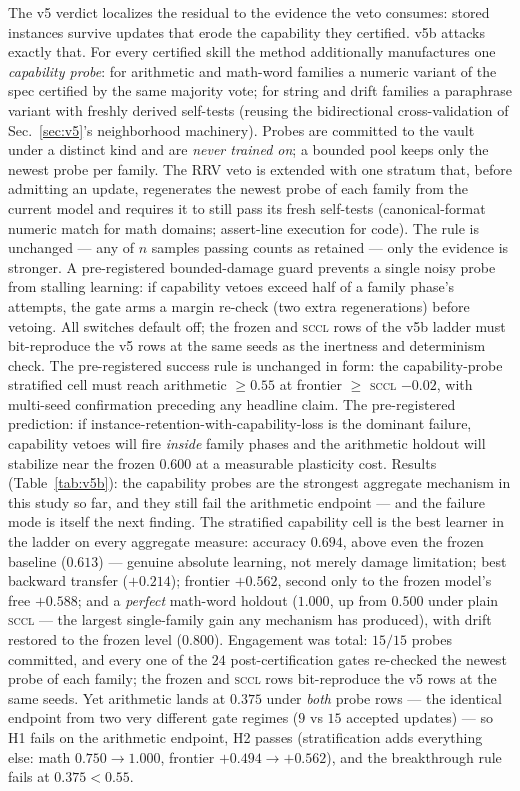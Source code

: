 \documentclass[10pt,conference]{IEEEtran}
\begin{document}
The v5 verdict localizes the residual to the evidence the veto consumes: stored instances survive updates that erode the capability they certified. v5b attacks exactly that. For every certified skill the method additionally manufactures one \emph{capability probe}: for arithmetic and math-word families a numeric variant of the spec certified by the same majority vote; for string and drift families a paraphrase variant with freshly derived self-tests (reusing the bidirectional cross-validation of Sec.~\ref{sec:v5}'s neighborhood machinery). Probes are committed to the vault under a distinct kind and are \emph{never trained on}; a bounded pool keeps only the newest probe per family. The RRV veto is extended with one stratum that, before admitting an update, regenerates the newest probe of each family from the current model and requires it to still pass its fresh self-tests (canonical-format numeric match for math domains; assert-line execution for code). The rule is unchanged --- any of $n$ samples passing counts as retained --- only the evidence is stronger. A pre-registered bounded-damage guard prevents a single noisy probe from stalling learning: if capability vetoes exceed half of a family phase's attempts, the gate arms a margin re-check (two extra regenerations) before vetoing. All switches default off; the frozen and \textsc{sccl} rows of the v5b ladder must bit-reproduce the v5 rows at the same seeds as the inertness and determinism check. The pre-registered success rule is unchanged in form: the capability-probe stratified cell must reach arithmetic $\geq 0.55$ at frontier $\geq$ \textsc{sccl} $-0.02$, with multi-seed confirmation preceding any headline claim. The pre-registered prediction: if instance-retention-with-capability-loss is the dominant failure, capability vetoes will fire \emph{inside} family phases and the arithmetic holdout will stabilize near the frozen $0.600$ at a measurable plasticity cost. Results (Table~\ref{tab:v5b}): the capability probes are the strongest aggregate mechanism in this study so far, and they still fail the arithmetic endpoint --- and the failure mode is itself the next finding. The stratified capability cell is the best learner in the ladder on every aggregate measure: accuracy $0.694$, above even the frozen baseline ($0.613$) --- genuine absolute learning, not merely damage limitation; best backward transfer ($+0.214$); frontier $+0.562$, second only to the frozen model's free $+0.588$; and a \emph{perfect} math-word holdout ($1.000$, up from $0.500$ under plain \textsc{sccl} --- the largest single-family gain any mechanism has produced), with drift restored to the frozen level ($0.800$). Engagement was total: $15/15$ probes committed, and every one of the $24$ post-certification gates re-checked the newest probe of each family; the frozen and \textsc{sccl} rows bit-reproduce the v5 rows at the same seeds. Yet arithmetic lands at $0.375$ under \emph{both} probe rows --- the identical endpoint from two very different gate regimes ($9$ vs $15$ accepted updates) --- so H1 fails on the arithmetic endpoint, H2 passes (stratification adds everything else: math $0.750 \to 1.000$, frontier $+0.494 \to +0.562$), and the breakthrough rule fails at $0.375 < 0.55$.
\end{document}
